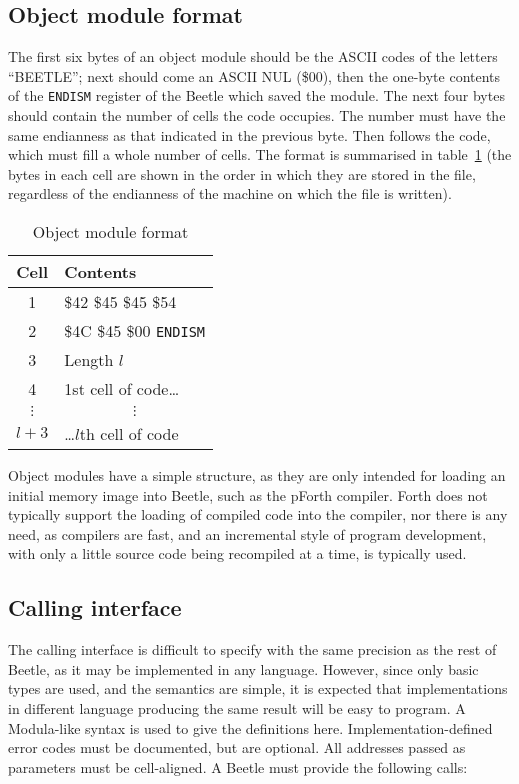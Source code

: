 \documentclass{article}
\begin{document}
\subsection{Object module format}
\label{object}

The first six bytes of an object module should be the ASCII codes of the letters
``BEETLE''; next should come an ASCII NUL (\$00), then the one-byte contents of
the {\tt ENDISM} register of the Beetle which saved the module. The next four
bytes should contain the number of cells the code occupies. The number must have
the same endianness as that indicated in the previous byte. Then follows the
code, which must fill a whole number of cells. The format is summarised in table~\ref{objecttable}
(the bytes in each cell are shown in the order in which they
are stored in the file, regardless of the endianness of the machine on which the
file is written).

\begin{table}[htbp]
\begin{center}
\begin{tabular}{cl} \toprule
\bf Cell & \bf Contents \\ \midrule
1 & \$42 \$45 \$45 \$54 \\
2 & \$4C \$45 \$00 {\tt ENDISM} \\
3 & Length $l$\/ \\
4 & 1st cell of code\dots \\
$\vdots$ & \multicolumn{1}{c}{$\vdots$} \\
$l+3$\/ & \dots$l$\/th cell of code \\ \bottomrule
\end{tabular}
\caption{\label{objecttable}Object module format}
\end{center}
\end{table}

Object modules have a simple structure, as they are only intended for loading an
initial memory image into Beetle, such as the pForth compiler. Forth does not
typically support the loading of compiled code into the compiler, nor there is
any need, as compilers are fast, and an incremental style of program
development, with only a little source code being recompiled at a time, is
typically used.


\subsection{Calling interface}
\label{calls}

The calling interface is difficult to specify with the same precision as the
rest of Beetle, as it may be implemented in any language. However, since only
basic types are used, and the semantics are simple, it is expected that
implementations in different language producing the same result will be easy to
program. A Modula-like syntax is used to give the definitions here.
Implementation-defined error codes must be documented, but are optional. All
addresses passed as parameters must be cell-aligned. A Beetle must provide the
following calls:
\end{document}
